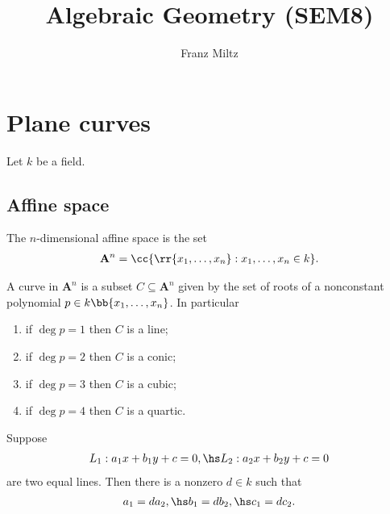 \documentclass{article}
\begin{document}
\mkthmstwounified
\title{Algebraic Geometry (SEM8)}
\author{Franz Miltz}
\maketitle
\tableofcontents
\pagebreak

\section{Plane curves}

Let $k$ be a field.

\subsection{Affine space}\label{sec:affine_space}

\begin{definition}
  The $n$-dimensional affine space is the set
  \begin{align*}
    \mathbf A^n = \cc{\rr{x_1,\ldots,x_n}:x_1,\ldots,x_n\in k}.
  \end{align*}
\end{definition}

\begin{definition}
  A curve in $\mathbf A^n$ is a subset $C\subseteq \mathbf A^n$ given by the
  set of roots of a nonconstant polynomial $p\in k\bb{x_1,\ldots,x_n}$.
  In particular
  \begin{enumerate}
    \item if $\deg p = 1$ then $C$ is a line;
    \item if $\deg p = 2$ then $C$ is a conic;
    \item if $\deg p = 3$ then $C$ is a cubic;
    \item if $\deg p = 4$ then $C$ is a quartic.
  \end{enumerate}
\end{definition}

\begin{proposition}
  Suppose
  \begin{align*}
    L_1 : a_1 x + b_1 y + c = 0, \hs
    L_2 : a_2 x + b_2 y + c = 0
  \end{align*}
  are two equal lines. Then there is a nonzero $d\in k$ such that
  \begin{align*}
    a_1 = d a_2, \hs b_1 = d b_2, \hs c_1 = d c_2.
  \end{align*}
\end{proposition}
\end{document}
